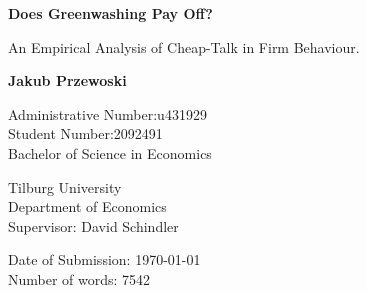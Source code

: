 \begin{titlepage}
    \begin{center}
        \vspace*{1cm}
 
        \Large
        \textbf{Does Greenwashing Pay Off?}
 
        \vspace{0.5cm}
        An Empirical Analysis of Cheap-Talk in Firm Behaviour.
        
        \vspace{1.5cm}
        
        \textbf{Jakub Przewoski}
        
        \vspace{0.5cm}
        \large
        Administrative Number:\@ u431929\\ 
        Student Number:\@ 2092491 \\
        Bachelor of Science in Economics \\
        
        \vfill
        
        Tilburg University\\
        Department of Economics\\
        Supervisor: David Schindler\\
        
        \vspace{0.8cm}
        
        Date of Submission: \today{} \\
        Number of words: 7542

            
    \end{center}
\end{titlepage}
